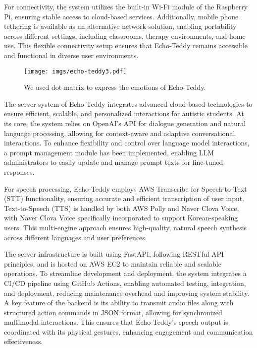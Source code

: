 For connectivity, the system utilizes the built-in Wi-Fi module of the Raspberry Pi, ensuring stable access to cloud-based services. Additionally, mobile phone tethering is available as an alternative network solution, enabling portability across different settings, including classrooms, therapy environments, and home use. This flexible connectivity setup ensures that Echo-Teddy remains accessible and functional in diverse user environments.

\begin{figure*}[hbt!]
    \centering
    \texttt{[image: imgs/echo-teddy3.pdf]}
    \caption{We used dot matrix to express the emotions of Echo-Teddy.}
    \label{fig:echo-teddy-dot-matrix}
\end{figure*}

The server system of Echo-Teddy integrates advanced cloud-based technologies to ensure efficient, scalable, and personalized interactions for autistic students. At its core, the system relies on OpenAI’s API for dialogue generation and natural language processing, allowing for context-aware and adaptive conversational interactions. To enhance flexibility and control over language model interactions, a prompt management module has been implemented, enabling LLM administrators to easily update and manage prompt texts for fine-tuned responses.

For speech processing, Echo-Teddy employs AWS Transcribe for Speech-to-Text (STT) functionality, ensuring accurate and efficient transcription of user input. Text-to-Speech (TTS) is handled by both AWS Polly and Naver Clova Voice, with Naver Clova Voice specifically incorporated to support Korean-speaking users. This multi-engine approach ensures high-quality, natural speech synthesis across different languages and user preferences.

The server infrastructure is built using FastAPI, following RESTful API principles, and is hosted on AWS EC2 to maintain reliable and scalable operations. To streamline development and deployment, the system integrates a CI/CD pipeline using GitHub Actions, enabling automated testing, integration, and deployment, reducing maintenance overhead and improving system stability. A key feature of the backend is its ability to transmit audio files along with structured action commands in JSON format, allowing for synchronized multimodal interactions. This ensures that Echo-Teddy’s speech output is coordinated with its physical gestures, enhancing engagement and communication effectiveness.


